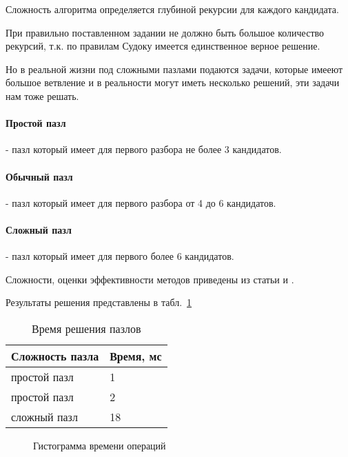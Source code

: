 Сложность алгоритма определяется глубиной рекурсии для каждого кандидата.

При правильно поставленном задании не должно быть большое количество рекурсий, т.к. по правилам Судоку имеется единственное верное решение. 

Но в реальной жизни под сложными пазлами подаются задачи, которые имееют большое ветвление и в реальности могут иметь несколько решений, эти задачи нам тоже решать.

\paragraph{Простой пазл} - пазл который имеет для первого разбора не более 3 кандидатов.

\paragraph{Обычный пазл} - пазл который имеет для первого разбора от 4 до 6 кандидатов.

\paragraph{Сложный пазл} - пазл который имеет для первого более 6 кандидатов.

Сложности, оценки эффективности методов приведены из статьи \cite{sudoku1} и \cite{sudoku2}.

Результаты решения представлены в табл.~\ref{tab:tres2}

\begin{table}[ht]
  \caption{Время решения пазлов}
  \begin{tabular}{|p{9cm}|p{5.5cm}|}
  \hline
  Сложность пазла & Время, мс \\
  \hline
  простой пазл & 1\\
  \hline
  простой пазл & 2\\
  \hline
  сложный пазл & 18\\
  \hline
  \end{tabular}
  \label{tab:tres2}
\end{table}


\begin{figure}[ht]
 \centering
 \caption{Гистограмма времени операций}
 \label{fig:ChDD1}
\end{figure}

